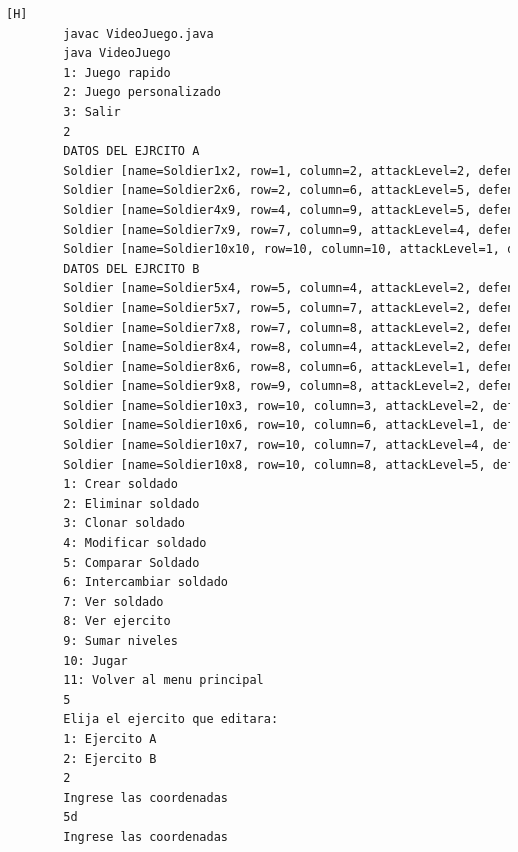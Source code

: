 \documentclass{article}
\begin{document}
	\begin{lstlisting}[language=bash,caption={Compilando y probando el metodo compareSoldier  }][H]
		javac VideoJuego.java
		java VideoJuego
		1: Juego rapido
		2: Juego personalizado
		3: Salir
		2
		DATOS DEL EJRCITO A
		Soldier [name=Soldier1x2, row=1, column=2, attackLevel=2, defenseLevel=3, actualLife=5, speed=0, attitude=Repose, current=true]
		Soldier [name=Soldier2x6, row=2, column=6, attackLevel=5, defenseLevel=1, actualLife=2, speed=0, attitude=Repose, current=true]
		Soldier [name=Soldier4x9, row=4, column=9, attackLevel=5, defenseLevel=4, actualLife=4, speed=0, attitude=Repose, current=true]
		Soldier [name=Soldier7x9, row=7, column=9, attackLevel=4, defenseLevel=2, actualLife=4, speed=0, attitude=Repose, current=true]
		Soldier [name=Soldier10x10, row=10, column=10, attackLevel=1, defenseLevel=1, actualLife=3, speed=0, attitude=Repose, current=true]
		DATOS DEL EJRCITO B
		Soldier [name=Soldier5x4, row=5, column=4, attackLevel=2, defenseLevel=1, actualLife=5, speed=0, attitude=Repose, current=true]
		Soldier [name=Soldier5x7, row=5, column=7, attackLevel=2, defenseLevel=1, actualLife=1, speed=0, attitude=Repose, current=true]
		Soldier [name=Soldier7x8, row=7, column=8, attackLevel=2, defenseLevel=1, actualLife=4, speed=0, attitude=Repose, current=true]
		Soldier [name=Soldier8x4, row=8, column=4, attackLevel=2, defenseLevel=4, actualLife=4, speed=0, attitude=Repose, current=true]
		Soldier [name=Soldier8x6, row=8, column=6, attackLevel=1, defenseLevel=4, actualLife=2, speed=0, attitude=Repose, current=true]
		Soldier [name=Soldier9x8, row=9, column=8, attackLevel=2, defenseLevel=4, actualLife=3, speed=0, attitude=Repose, current=true]
		Soldier [name=Soldier10x3, row=10, column=3, attackLevel=2, defenseLevel=1, actualLife=4, speed=0, attitude=Repose, current=true]
		Soldier [name=Soldier10x6, row=10, column=6, attackLevel=1, defenseLevel=3, actualLife=1, speed=0, attitude=Repose, current=true]
		Soldier [name=Soldier10x7, row=10, column=7, attackLevel=4, defenseLevel=5, actualLife=5, speed=0, attitude=Repose, current=true]
		Soldier [name=Soldier10x8, row=10, column=8, attackLevel=5, defenseLevel=2, actualLife=3, speed=0, attitude=Repose, current=true]
		1: Crear soldado
		2: Eliminar soldado
		3: Clonar soldado
		4: Modificar soldado
		5: Comparar Soldado
		6: Intercambiar soldado
		7: Ver soldado
		8: Ver ejercito
		9: Sumar niveles
		10: Jugar
		11: Volver al menu principal
		5
		Elija el ejercito que editara:
		1: Ejercito A
		2: Ejercito B
		2
		Ingrese las coordenadas
		5d
		Ingrese las coordenadas

\end{lstlisting}
\end{document}

